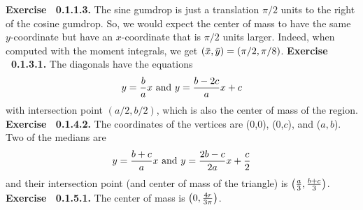 \par 
 {\noindent \protect \bf  Exercise ~0.1.1.3.} The sine gumdrop is just a translation $\pi /2$ units to the right of the cosine gumdrop. So, we would expect the center of mass to have the same $y$-coordinate but have an $x$-coordinate that is $\pi /2$ units larger. Indeed, when computed with the moment integrals, we get $\left (\protect \mathaccentV {bar}016{x},\protect \mathaccentV {bar}016{y}\right )=\left (\pi /2,\pi /8\right )$.  \protect \newline  \protect \newline  
 {\noindent \protect \bf  Exercise ~0.1.3.1.} The diagonals have the equations $$ y=\protect \frac  {b}{a}x \protect \text  { and } y=\protect \frac  {b-2c}{a}x+c$$ with intersection point $(a/2,b/2)$, which is also the center of mass of the region. \protect \newline  \protect \newline  
 {\noindent \protect \bf  Exercise ~0.1.4.2.} The coordinates of the vertices are (0,0), (0,$c$), and ($a,b$). Two of the medians are $$y=\protect \frac  {b+c}{a}x \protect \text  { and } y=\protect \frac  {2b-c}{2a}x+\protect \frac  {c}{2}$$ and their intersection point (and center of mass of the triangle) is $\left (\protect \frac  {a}{3},\protect \frac  {b+c}{3}\right )$. \protect \newline  \protect \newline  
 {\noindent \protect \bf  Exercise ~0.1.5.1.} The center of mass is $\left ( 0, \protect \frac  {4r}{3\pi }\right )$. \protect \newline  \protect \newline  
